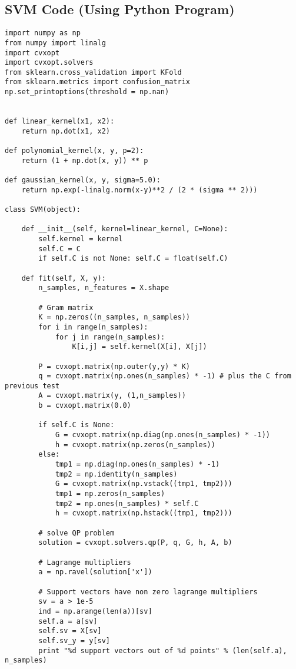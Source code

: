 \documentclass{article}
\begin{document}
\subsection{SVM Code (Using Python Program)}
\begin{verbatim}
import numpy as np
from numpy import linalg
import cvxopt
import cvxopt.solvers
from sklearn.cross_validation import KFold
from sklearn.metrics import confusion_matrix
np.set_printoptions(threshold = np.nan)


def linear_kernel(x1, x2):
    return np.dot(x1, x2)

def polynomial_kernel(x, y, p=2):
    return (1 + np.dot(x, y)) ** p

def gaussian_kernel(x, y, sigma=5.0):
    return np.exp(-linalg.norm(x-y)**2 / (2 * (sigma ** 2)))

class SVM(object):

    def __init__(self, kernel=linear_kernel, C=None):
        self.kernel = kernel
        self.C = C
        if self.C is not None: self.C = float(self.C)

    def fit(self, X, y):
        n_samples, n_features = X.shape

        # Gram matrix
        K = np.zeros((n_samples, n_samples))
        for i in range(n_samples):
            for j in range(n_samples):
                K[i,j] = self.kernel(X[i], X[j])

        P = cvxopt.matrix(np.outer(y,y) * K)
        q = cvxopt.matrix(np.ones(n_samples) * -1) # plus the C from previous test
        A = cvxopt.matrix(y, (1,n_samples))
        b = cvxopt.matrix(0.0)

        if self.C is None:
            G = cvxopt.matrix(np.diag(np.ones(n_samples) * -1))
            h = cvxopt.matrix(np.zeros(n_samples))
        else:
            tmp1 = np.diag(np.ones(n_samples) * -1)
            tmp2 = np.identity(n_samples)
            G = cvxopt.matrix(np.vstack((tmp1, tmp2)))
            tmp1 = np.zeros(n_samples)
            tmp2 = np.ones(n_samples) * self.C
            h = cvxopt.matrix(np.hstack((tmp1, tmp2)))

        # solve QP problem
        solution = cvxopt.solvers.qp(P, q, G, h, A, b)

        # Lagrange multipliers
        a = np.ravel(solution['x'])

        # Support vectors have non zero lagrange multipliers
        sv = a > 1e-5
        ind = np.arange(len(a))[sv]
        self.a = a[sv]
        self.sv = X[sv]
        self.sv_y = y[sv]
        print "%d support vectors out of %d points" % (len(self.a), n_samples)


\end{verbatim}
\end{document}
